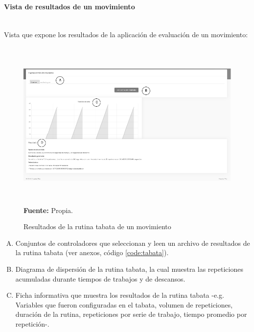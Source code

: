 \paragraph{Vista de resultados de un movimiento}\mbox{} \\ \label{ins:UI:web:result}
Vista que expone los resultados de la aplicaci\'on de evaluaci\'on de un movimiento:
\begin{figure}[H]
	\caption{Resultados de la rutina tabata de un movimiento}
	\label{fig:resultsTabata}
	\centering
	\includegraphics[width=460px,height=320px]{graphics/web-results.PNG} \\
	\textbf{Fuente:} Propia.
\end{figure}
\begin{enumerate}[A.]
\item Conjuntos de controladores que seleccionan y leen un archivo de resultados de la rutina tabata (ver anexos, c\'odigo \ref{code:tabata}).
\item Diagrama de dispersi\'on de la rutina tabata, la cual muestra las repeticiones acumuladas durante tiempos de trabajos y de descansos.
\item Ficha informativa que muestra los resultados de la rutina tabata -e.g. Variables que fueron configuradas en el tabata, volumen de repeticiones, duraci\'on de la rutina, repeticiones por serie de trabajo, tiempo promedio por repetici\'on-.
\end{enumerate}
